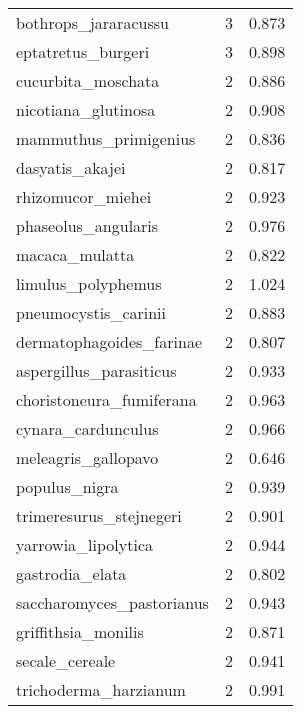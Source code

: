\begin{tabular}{lrr}
           bothrops\_jararacussu &                   3 &     0.873 \\
             eptatretus\_burgeri &                   3 &     0.898 \\
             cucurbita\_moschata &                   2 &     0.886 \\
            nicotiana\_glutinosa &                   2 &     0.908 \\
          mammuthus\_primigenius &                   2 &     0.836 \\
                dasyatis\_akajei &                   2 &     0.817 \\
              rhizomucor\_miehei &                   2 &     0.923 \\
            phaseolus\_angularis &                   2 &     0.976 \\
                 macaca\_mulatta &                   2 &     0.822 \\
             limulus\_polyphemus &                   2 &     1.024 \\
           pneumocystis\_carinii &                   2 &     0.883 \\
       dermatophagoides\_farinae &                   2 &     0.807 \\
        aspergillus\_parasiticus &                   2 &     0.933 \\
       choristoneura\_fumiferana &                   2 &     0.963 \\
             cynara\_cardunculus &                   2 &     0.966 \\
            meleagris\_gallopavo &                   2 &     0.646 \\
                  populus\_nigra &                   2 &     0.939 \\
        trimeresurus\_stejnegeri &                   2 &     0.901 \\
            yarrowia\_lipolytica &                   2 &     0.944 \\
                gastrodia\_elata &                   2 &     0.802 \\
      saccharomyces\_pastorianus &                   2 &     0.943 \\
            griffithsia\_monilis &                   2 &     0.871 \\
                 secale\_cereale &                   2 &     0.941 \\
          trichoderma\_harzianum &                   2 &     0.991 \\

\end{tabular}
